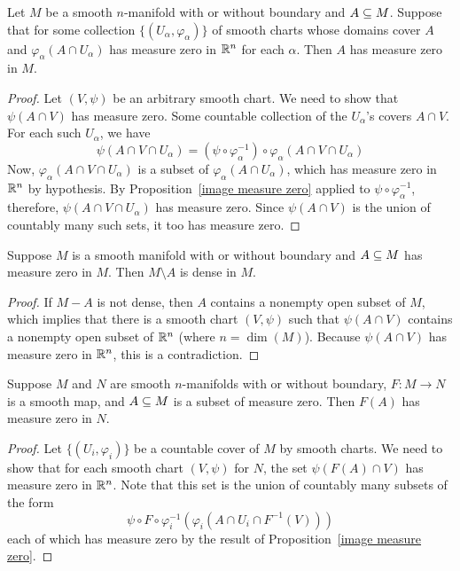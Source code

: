 \begin{lemma}
Let $M$ be a smooth $n$-manifold with or without boundary and $A\subseteq M$. Suppose that for some collection $\{(U_\alpha,\varphi_\alpha)\}$ of smooth charts whose domains cover $A$ and $\varphi_\alpha(A\cap U_\alpha)$ has measure zero in $\mathbb{R}^n$ for each  $\alpha$. Then $A$ has measure zero in $M$.
\end{lemma}
\begin{proof}
Let $(V,\psi)$ be an arbitrary smooth chart. We need to show that $\psi(A\cap V)$ has measure zero. Some countable collection of the $U_\alpha$'s covers $A\cap V$. For each such $U_\alpha$, we have
\[\psi(A\cap V\cap U_\alpha)=(\psi\circ\varphi_\alpha^{-1})\circ\varphi_\alpha(A\cap V\cap U_\alpha)\]
Now, $\varphi_\alpha(A\cap V\cap U_\alpha)$ is a subset of $\varphi_\alpha(A\cap U_\alpha)$, which has measure zero in $\mathbb{R}^n$ by hypothesis. By Proposition~\ref{image measure zero} applied to $\psi\circ\varphi_\alpha^{-1}$, therefore, $\psi(A\cap V\cap U_\alpha)$ has measure zero. Since $\psi(A\cap V)$ is the union of countably many such sets, it too has measure zero.
\end{proof}
\begin{proposition}
Suppose $M$ is a smooth manifold with or without boundary and $A\subseteq M$ has measure zero in $M$. Then $M\setminus A$ is dense in $M$.
\end{proposition}
\begin{proof}
If $M-A$ is not dense, then $A$ contains a nonempty open subset of $M$, which implies that there is a smooth chart $(V,\psi)$ such that $\psi(A\cap V)$ contains a nonempty open subset of $\mathbb{R}^n$ (where $n=\dim(M)$). Because $\psi(A\cap V)$ has measure zero in $\mathbb{R}^n$, this is a contradiction.
\end{proof}
\begin{theorem}
Suppose $M$ and $N$ are smooth $n$-manifolds with or without boundary, $F:M\to N$ is a smooth map, and $A\subseteq M$ is a subset of measure zero. Then $F(A)$ has measure zero in $N$.
\end{theorem}
\begin{proof}
Let $\{(U_i,\varphi_i)\}$ be a countable cover of $M$ by smooth charts. We need to show that for each smooth chart $(V,\psi)$ for $N$, the set $\psi(F(A)\cap V)$ has measure zero in $\mathbb{R}^n$. Note that this set is the union of countably many subsets of the form 
\[\psi\circ F\circ\varphi_i^{-1}(\varphi_i(A\cap U_i\cap F^{-1}(V)))\]
each of which has measure zero by the result of Proposition~\ref{image measure zero}.
\end{proof}
